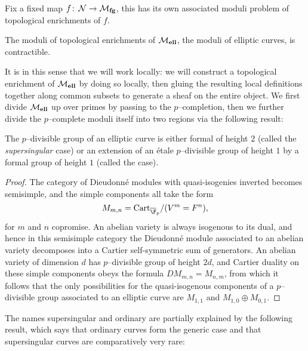 Fix a fixed map $f\colon\thinspace \mathcal{N} \to \mathcal{M}_{\mathbf{fg}}$, this has its own associated moduli problem of topological enrichments of $f$.


\begin{theorem}
The moduli of topological enrichments of $\mathcal{M}_{\mathbf{ell}}$, the moduli of elliptic curves, is contractible.
\end{theorem}

It is in this sense that we will work locally: we will construct a topological enrichment of $\mathcal{M}_{\mathbf{ell}}$ by doing so locally, then gluing the resulting local definitions together along common subsets to generate a sheaf on the entire object.  We first divide $\mathcal{M}_{\mathbf{ell}}$ up over primes by passing to the $p$--completion, then we further divide the $p$--complete moduli itself into two regions via the following result:

\begin{lemma}
The $p$--divisible group of an elliptic curve is either formal of height $2$ (called the \textit{supersingular} case) or an extension of an \'etale $p$--divisible group of height $1$ by a formal group of height $1$ (called the  case).
\end{lemma}
\begin{proof}
The category of Dieudonn\'e modules with quasi-isogenies inverted becomes semisimple, and the simple components all take the form \[M_{m, n} = \Cart_{\overline{\F}_p} / (V^m = F^n),\] for $m$ and $n$ copromise.  An abelian variety is always isogenous to its dual, and hence in this semisimple category the Dieudonn\'e module associated to an abelian variety decomposes into a Cartier self-symmetric sum of generators.  An abelian variety of dimension $d$ has $p$--divisible group of height $2d$, and Cartier duality on these simple components obeys the formula $DM_{m,n} = M_{n,m}$, from which it follows that the only possibilities for the quasi-isogenous components of a $p$--divisible group associated to an elliptic curve are $M_{1,1}$ and $M_{1,0} \oplus M_{0,1}$.
\end{proof}

The names supersingular and ordinary are partially explained by the following result, which says that ordinary curves form the generic case and that supersingular curves are comparatively very rare:

